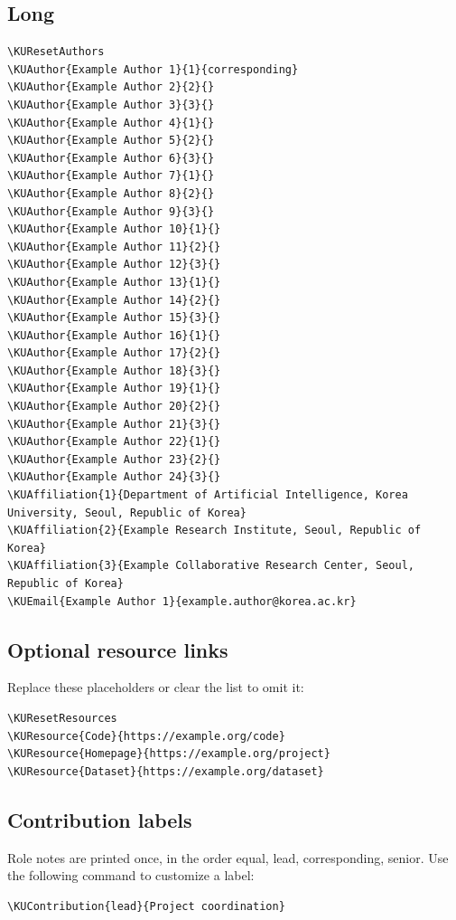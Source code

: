 \subsection{Long}
\begin{lstlisting}[style=promptstyle]
% Illustrative metadata; replace all placeholder identities.
\KUResetAuthors
\KUAuthor{Example Author 1}{1}{corresponding}
\KUAuthor{Example Author 2}{2}{}
\KUAuthor{Example Author 3}{3}{}
\KUAuthor{Example Author 4}{1}{}
\KUAuthor{Example Author 5}{2}{}
\KUAuthor{Example Author 6}{3}{}
\KUAuthor{Example Author 7}{1}{}
\KUAuthor{Example Author 8}{2}{}
\KUAuthor{Example Author 9}{3}{}
\KUAuthor{Example Author 10}{1}{}
\KUAuthor{Example Author 11}{2}{}
\KUAuthor{Example Author 12}{3}{}
\KUAuthor{Example Author 13}{1}{}
\KUAuthor{Example Author 14}{2}{}
\KUAuthor{Example Author 15}{3}{}
\KUAuthor{Example Author 16}{1}{}
\KUAuthor{Example Author 17}{2}{}
\KUAuthor{Example Author 18}{3}{}
\KUAuthor{Example Author 19}{1}{}
\KUAuthor{Example Author 20}{2}{}
\KUAuthor{Example Author 21}{3}{}
\KUAuthor{Example Author 22}{1}{}
\KUAuthor{Example Author 23}{2}{}
\KUAuthor{Example Author 24}{3}{}
\KUAffiliation{1}{Department of Artificial Intelligence, Korea University, Seoul, Republic of Korea}
\KUAffiliation{2}{Example Research Institute, Seoul, Republic of Korea}
\KUAffiliation{3}{Example Collaborative Research Center, Seoul, Republic of Korea}
\KUEmail{Example Author 1}{example.author@korea.ac.kr}
\end{lstlisting}

\subsection{Optional resource links}
Replace these placeholders or clear the list to omit it:
\begin{lstlisting}[style=promptstyle]
\KUResetResources
\KUResource{Code}{https://example.org/code}
\KUResource{Homepage}{https://example.org/project}
\KUResource{Dataset}{https://example.org/dataset}
\end{lstlisting}
\subsection{Contribution labels}
Role notes are printed once, in the order equal, lead, corresponding, senior.
Use the following command to customize a label:
\begin{lstlisting}[style=promptstyle]
\KUContribution{lead}{Project coordination}
\end{lstlisting}

